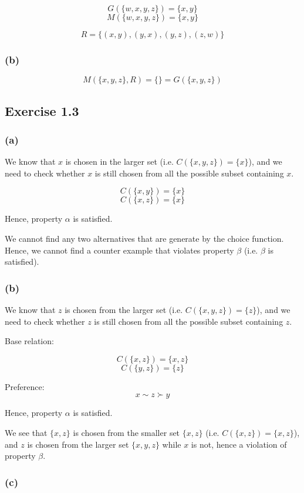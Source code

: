 \documentclass[a4paper]{article}
\begin{document}
\[G(\{w,x,y,z\})=\{x,y\} \]
\[M(\{w,x,y,z\})=\{x,y\} \]

\[R=\{(x,y), (y,x), (y,z), (z,w) \} \]

\subsubsection*{(b)}

\[M(\{x,y,z\}, R)=\{\}=G(\{x,y,z\}) \]

\subsection*{Exercise 1.3}

\subsubsection*{(a)}

We know that $x$ is chosen in the larger set (i.e. $C(\{x,y,z\})=\{x\}$), and we need to check whether $x$ is still chosen from all the possible subset containing $x$.

\[C(\{x,y\})=\{x\} \]
\[C(\{x,z\})=\{x\} \]

Hence, property $\alpha$ is satisfied.

We cannot find any two alternatives that are generate by the choice function. Hence, we cannot find a counter example that violates property $\beta$ (i.e. $\beta$ is satisfied).

\subsubsection*{(b)}

We know that $z$ is chosen from the larger set (i.e. $C(\{x,y,z\})=\{z\}$), and we need to check whether $z$ is still chosen from all the possible subset containing $z$.

Base relation:

\[C(\{x,z\})=\{x,z\} \]
\[C(\{y,z\})=\{z\} \]

Preference:
\[x\sim z \succ y \]

Hence, property $\alpha$ is satisfied.

We see that $\{x,z\}$ is chosen from the smaller set $\{x,z\}$ (i.e. $C(\{x,z\})=\{x,z\}$), and $z$ is chosen from the larger set $\{x,y,z\}$ while $x$ is not, hence a violation of property $\beta$.

\subsubsection*{(c)}
\end{document}
